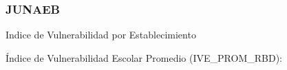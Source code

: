 \subsubsection{JUNAEB}
\begin{longdescription}
  \item[Indice de Vulnerabilidad por Establecimiento] \hfill \\
    \begin{longdescription}
        \item[Índice de Vulnerabilidad Escolar Promedio](IVE\_PROM\_RBD):
    \end{longdescription}
\end{longdescription}